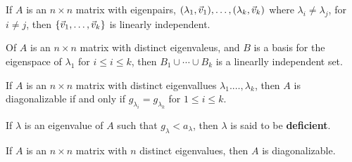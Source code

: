 \documentclass[english, 12pt]{article}
\begin{document}
\begin{thrm}
If $A$ is an $n \times n$ matrix with eigenpairs,
$(\lambda_1,\vec{v}_1),\dots,(\lambda_k,\vec{v}_k)$ where $\lambda_i \neq \lambda_j$, for $i \neq j$, then $\{\vec{v}_1,\dots,\vec{v}_k\}$ is linearly independent.
\end{thrm}

\begin{thrm}
Of $A$ is an $ n\times n$ matrix with distinct eigenvaleus, and $B$ is a basis for the eigenspace of $\lambda_1$ for $i \leq i \leq k$, then $B_1 \cup \cdots \cup B_k$ is a linearlly independent set.
\end{thrm}

\begin{thrm}
If $A$ is an $n \times n$ matrix with distinct eigenvallues $\lambda_1.\dots,\lambda_k$, then $A$ is diagonalizable if and only if $g_{\lambda_i} = g_{\lambda_k}$ for $1 \leq i \leq k$.
\end{thrm}

\begin{note}
If $\lambda$ is an eigenvalue of $A$ such that $g_\lambda < a_\lambda$, then $\lambda$ is said to be \textbf{deficient}.
\end{note}

\begin{thrm}
If $A$ is an $n \times n$ matrix with $n$ distinct eigenvalues, then $A$ is diagonalizable.
\end{thrm}
\end{document}
